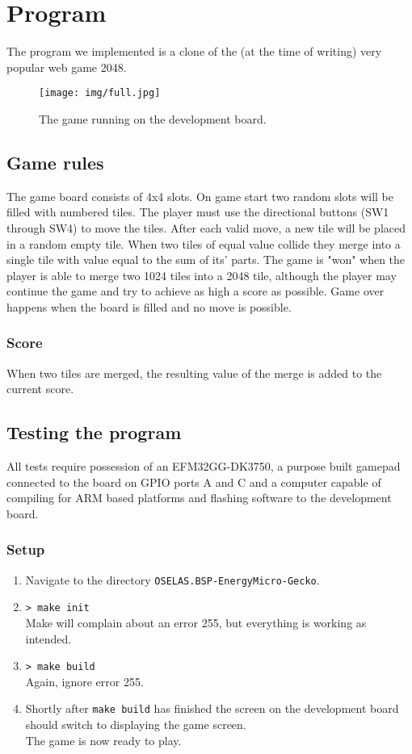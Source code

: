 \section{Program}
The program we implemented is a clone of the (at the time of writing) very popular web game 2048\cite{2048}. 

\begin{figure}[h!]
    \centering
    \texttt{[image: img/full.jpg]}
    \caption{The game running on the development board.}
\end{figure}

\subsection{Game rules\label{game_rules}}
The game board consists of 4x4 slots.
On game start two random slots will be filled with numbered tiles.
The player must use the directional buttons (SW1 through SW4) to move the tiles.
After each valid move, a new tile will be placed in a random empty tile.
When two tiles of equal value collide they merge into a single tile with value equal to the sum of its' parts.
The game is "won" when the player is able to merge two 1024 tiles into a 2048 tile, although the player may continue the game and try to achieve as high a score as possible.
Game over happens when the board is filled and no move is possible.

\subsubsection{Score}
When two tiles are merged, the resulting value of the merge is added to the current score.

\subsection{Testing the program}
All tests require possession of an EFM32GG-DK3750, a purpose built gamepad connected to the board on GPIO ports A and C and a computer capable of compiling for ARM based platforms and flashing software to the development board.

\subsubsection{Setup}
\begin{enumerate}
    \item   Navigate to the directory \texttt{OSELAS.BSP-EnergyMicro-Gecko}.
    \item   \texttt{> make init}\\
	    Make will complain about an error 255, but everything is working as intended.
    \item   \texttt{> make build}\\
	    Again, ignore error 255.
    \item   Shortly after \texttt{make build} has finished the screen on the development board should switch to displaying the game screen.\\
	    The game is now ready to play.
\end{enumerate}

